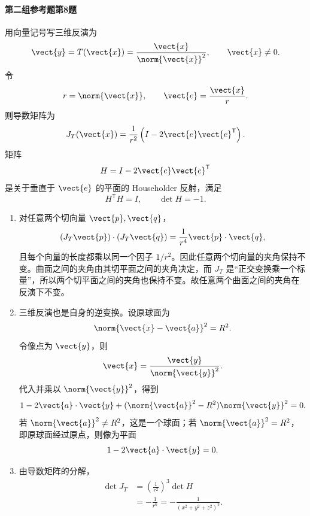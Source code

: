 \paragraph{第二组参考题第8题}
\begin{xsolution}
用向量记号写三维反演为
\[
  \vect{y}=T(\vect{x})=
  \frac{\vect{x}}{\norm{\vect{x}}^2},
  \qquad \vect{x}\ne0.
\]
令
\[
  r=\norm{\vect{x}},
  \qquad
  \vect{e}=\frac{\vect{x}}r.
\]
则导数矩阵为
\[
  J_T(\vect{x})
  =\frac1{r^2}\left(I-2\vect{e}\vect{e}^{\mathsf T}\right).
\]
矩阵
\[
  H=I-2\vect{e}\vect{e}^{\mathsf T}
\]
是关于垂直于 $\vect{e}$ 的平面的 Householder 反射，满足
\[
  H^{\mathsf T}H=I,
  \qquad
  \det H=-1.
\]

\begin{enumerate}[label=(\arabic*)]
  \item 对任意两个切向量 $\vect{p},\vect{q}$，
  \[
    (J_T\vect{p})\cdot(J_T\vect{q})
    =\frac1{r^4}\vect{p}\cdot\vect{q},
  \]
  且每个向量的长度都乘以同一个因子 $1/r^2$。因此任意两个切向量的夹角保持不变。曲面之间的夹角由其切平面之间的夹角决定，而 $J_T$ 是“正交变换乘一个标量”，所以两个切平面之间的夹角也保持不变。故任意两个曲面之间的夹角在反演下不变。

  \item 三维反演也是自身的逆变换。设原球面为
  \[
    \norm{\vect{x}-\vect{a}}^2=R^2.
  \]
  令像点为 $\vect{y}$，则
  \[
    \vect{x}=\frac{\vect{y}}{\norm{\vect{y}}^2}.
  \]
  代入并乘以 $\norm{\vect{y}}^2$，得到
  \[
    1-2\vect{a}\cdot\vect{y}
    +(\norm{\vect{a}}^2-R^2)\norm{\vect{y}}^2=0.
  \]
  若 $\norm{\vect{a}}^2\ne R^2$，这是一个球面；若 $\norm{\vect{a}}^2=R^2$，即原球面经过原点，则像为平面
  \[
    1-2\vect{a}\cdot\vect{y}=0.
  \]

  \item 由导数矩阵的分解，
  \[
  \begin{aligned}
    \det J_T
    &=\left(\frac1{r^2}\right)^3\det H\\
    &=-\frac1{r^6}
    =-\frac1{(x^2+y^2+z^2)^3}.
  \end{aligned}
  \]
\end{enumerate}
\end{xsolution}
